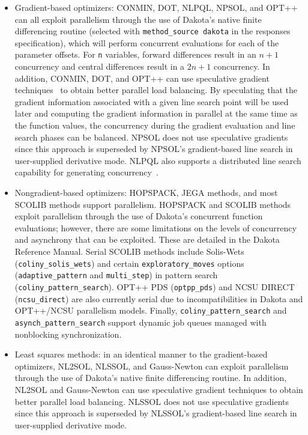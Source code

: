 \begin{itemize}
\item Gradient-based optimizers: CONMIN, DOT, NLPQL, NPSOL, and OPT++
  can all exploit parallelism through the use of Dakota's native finite
  differencing routine (selected with \texttt{method\_source dakota}
  in the responses specification), which will perform concurrent
  evaluations for each of the parameter offsets. For \texttt{n}
  variables, forward differences result in an $n+1$ concurrency and
  central differences result in a $2n+1$ concurrency. In addition,
  CONMIN, DOT, and OPT++ can use speculative gradient
  techniques~\cite{Byr88} to obtain better parallel load balancing. By
  speculating that the gradient information associated with a given
  line search point will be used later and computing the gradient
  information in parallel at the same time as the function values, the
  concurrency during the gradient evaluation and line search phases
  can be balanced. NPSOL does not use speculative gradients since this
  approach is superseded by NPSOL's gradient-based line search in
  user-supplied derivative mode.  NLPQL also supports a distributed
  line search capability for generating concurrency~\cite{Sch04}.

\item Nongradient-based optimizers: HOPSPACK, JEGA methods, and most
  SCOLIB methods support parallelism.  HOPSPACK and SCOLIB methods
  exploit parallelism through the use of Dakota's concurrent function
  evaluations; however, there are some limitations on the levels of
  concurrency and asynchrony that can be exploited.  These are detailed
  in the Dakota Reference Manual. Serial SCOLIB methods include
  Solis-Wets (\texttt{coliny\_solis\_wets}) and certain
  \texttt{exploratory\_moves} options (\texttt{adaptive\_pattern} and
  \texttt{multi\_step}) in pattern search
  (\texttt{coliny\_pattern\_search}).  OPT++ PDS (\texttt{optpp\_pds})
  and NCSU DIRECT (\texttt{ncsu\_direct}) are also currently serial
  due to incompatibilities in Dakota and OPT++/NCSU parallelism
  models.  Finally, \texttt{coliny\_pattern\_search} and
  \texttt{asynch\_pattern\_search} support dynamic job queues managed
  with nonblocking synchronization.

\item Least squares methods: in an identical manner to the
  gradient-based optimizers, NL2SOL, NLSSOL, and Gauss-Newton can
  exploit parallelism through the use of Dakota's native finite
  differencing routine. In addition, NL2SOL and Gauss-Newton can use
  speculative gradient techniques to obtain better parallel load
  balancing. NLSSOL does not use speculative gradients since this
  approach is superseded by NLSSOL's gradient-based line search in
  user-supplied derivative mode.


\end{itemize}

